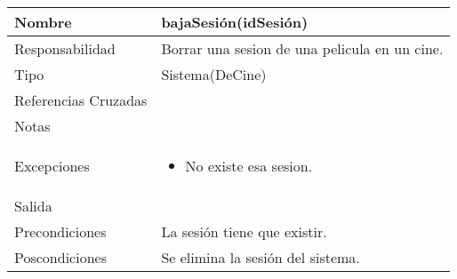 \documentclass{article}
\begin{document}
\begin{table}[h]
\begin{tabular}{|l|l|l|l|l|l|}
\hline
\multicolumn{2}{|p{3cm}|}{Nombre} & \multicolumn{4}{p{10cm}|}{\textbf{bajaSesión(idSesión)}}\\
\hline
\multicolumn{2}{|p{3cm}|}{Responsabilidad} & \multicolumn{4}{p{10cm}|}{Borrar una sesion de una pelicula en un cine.} \\
\hline
\multicolumn{2}{|p{3cm}|}{Tipo} & \multicolumn{4}{p{10cm}|}{Sistema(DeCine)} \\
\hline
\multicolumn{2}{|p{3cm}|}{Referencias Cruzadas} & \multicolumn{4}{p{10cm}|}{} \\
\hline
\multicolumn{2}{|p{3cm}|}{Notas} & \multicolumn{4}{p{10cm}|}{} \\
\hline
\multicolumn{2}{|p{3cm}|}{Excepciones} & \multicolumn{4}{p{10cm}|}{\begin{itemize}
\item No existe esa sesion.
\end{itemize}} \\
\hline
\multicolumn{2}{|p{3cm}|}{Salida} & \multicolumn{4}{p{10cm}|}{} \\
\hline
\multicolumn{2}{|p{3cm}|}{Precondiciones} & \multicolumn{4}{p{10cm}|}{La sesión tiene que existir.} \\
\hline
\multicolumn{2}{|p{3cm}|}{Poscondiciones} & \multicolumn{4}{p{10cm}|}{Se elimina la sesión del sistema.} \\
\hline
\end{tabular}
\end{table}
\end{document}
